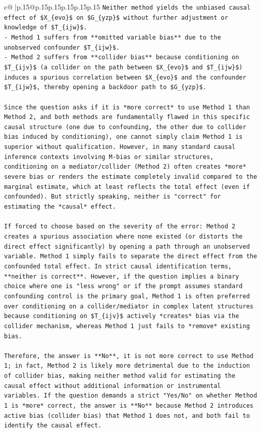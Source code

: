 \documentclass{article}
\begin{document}
{\begin{supertabular}{c@{$\;$}|p{.15\linewidth}@{}p{.15\linewidth}p{.15\linewidth}p{.15\linewidth}p{.15\linewidth}p{.15\linewidth}}
{{{\texttt{Neither method yields the unbiased causal effect of \$X\_\{evo\}\$ on \$G\_\{yzp\}\$ without further adjustment or knowledge of \$T\_\{ijw\}\$.} \\
\texttt{{-} Method 1 suffers from **omitted variable bias** due to the unobserved confounder \$T\_\{ijw\}\$.} \\
\texttt{{-} Method 2 suffers from **collider bias** because conditioning on \$T\_\{ijv\}\$ (a collider on the path between \$X\_\{evo\}\$ and \$T\_\{ijw\}\$) induces a spurious correlation between \$X\_\{evo\}\$ and the confounder \$T\_\{ijw\}\$, thereby opening a backdoor path to \$G\_\{yzp\}\$.} \\
\\ 
\texttt{Since the question asks if it is *more correct* to use Method 1 than Method 2, and both methods are fundamentally flawed in this specific causal structure (one due to confounding, the other due to collider bias induced by conditioning), one cannot simply claim Method 1 is superior without qualification. However, in many standard causal inference contexts involving M{-}bias or similar structures, conditioning on a mediator/collider (Method 2) often creates *more* severe bias or renders the estimate completely invalid compared to the marginal estimate, which at least reflects the total effect (even if confounded). But strictly speaking, neither is "correct" for estimating the *causal* effect.} \\
\\ 
\texttt{If forced to choose based on the severity of the error: Method 2 creates a spurious association where none existed (or distorts the direct effect significantly) by opening a path through an unobserved variable. Method 1 simply fails to separate the direct effect from the confounded total effect. In strict causal identification terms, **neither is correct**. However, if the question implies a binary choice where one is "less wrong" or if the prompt assumes standard confounding control is the primary goal, Method 1 is often preferred over conditioning on a collider/mediator in complex latent structures because conditioning on \$T\_\{ijv\}\$ actively *creates* bias via the collider mechanism, whereas Method 1 just fails to *remove* existing bias.} \\
\\ 
\texttt{Therefore, the answer is **No**, it is not more correct to use Method 1; in fact, Method 2 is likely more detrimental due to the induction of collider bias, making neither method valid for estimating the causal effect without additional information or instrumental variables. If the question demands a strict "Yes/No" on whether Method 1 is *more* correct, the answer is **No** because Method 2 introduces active bias (collider bias) that Method 1 does not, and both fail to identify the causal effect.} \\
}}}
\end{supertabular}}
\end{document}
